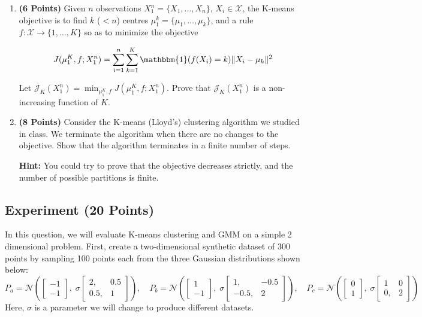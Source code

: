 \documentclass[letter]{article}
\newcounter{thm}
\newcommand{\Ncal}{\mathcal{N}}
\newcommand{\Xcal}{\mathcal{X}}
\newcommand{\Jcal}{\mathcal{J}}
\newcommand{\indfone}{\mathbbm{1}}
\theoremstyle{definition}
\begin{document}
\begin{enumerate}

\item \textbf{(6 Points)}
Given $n$ observations $X_1^n = \{X_1, \dots, X_n\}$, $X_i \in \Xcal$, the K-means objective
is to find $k$
($<n$) centres $\mu_1^k = \{\mu_1, \dots, \mu_k\}$, and a rule $f:\Xcal \rightarrow
\{1,\dots, K\}$ so as to minimize the objective

\begin{equation}
J(\mu_1^K, f; X_1^n) = \sum_{i=1}^n \sum_{k=1}^K \indfone(f(X_i) = k) \|X_i - \mu_k\|^2
\label{eqn:kmeans}
\end{equation}

Let $\Jcal_K(X_1^n) = \min_{\mu_1^K, f} J(\mu_1^K, f; X_1^n)$. Prove that
$\Jcal_{K}(X_1^n)$ is a non-increasing function of $K$.

\item \textbf{(8 Points)}
Consider the K-means (Lloyd's) clustering algorithm we studied in class. We
terminate the algorithm when there are no changes to the objective.
Show that the algorithm terminates in a finite number of steps.

\textbf{Hint: }You could try to prove that the objective decreases strictly, and the number of possible partitions is finite.
\end{enumerate}



\subsection{Experiment (20 Points)}

In this question, we will evaluate
K-means clustering and GMM on a simple 2 dimensional problem.
First, create a two-dimensional synthetic dataset of 300 points by sampling 100 points each from the
three Gaussian distributions shown below:
\[
P_a = \Ncal\left(
\begin{bmatrix}
-1 \\ -1
\end{bmatrix},
\;
\sigma\begin{bmatrix}
2, &0.5 \\ 0.5, &1
\end{bmatrix}
\right),
\quad
P_b = \Ncal\left(
\begin{bmatrix}
1 \\ -1
\end{bmatrix},
\;
 \sigma\begin{bmatrix}
1, &-0.5 \\ -0.5, &2
\end{bmatrix}
\right),
\quad
P_c = \Ncal\left(
\begin{bmatrix}
0 \\ 1
\end{bmatrix},
\;
 \sigma\begin{bmatrix}
1 &0 \\ 0, &2
\end{bmatrix}
\right)
\]
Here, $\sigma$ is a parameter we will change to produce different datasets.\\
\end{document}
